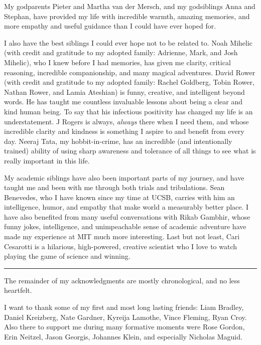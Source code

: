 My godparents Pieter and Martha van der Mersch, and my godsiblings Anna and Stephan, have provided my life with incredible warmth, amazing memories, and more empathy and useful guidance than I could have ever hoped for.



I also have the best siblings I could ever hope not to be related to.
%
Noah Mihelic (with credit and gratitude to my adopted family: Adrienne, Mark, and Josh Mihelic), who I knew before I had memories, has given me clarity, critical reasoning, incredible companionship, and many magical adventures.
%
David Rower (with credit and gratitude to my adopted family: Rachel Goldberg, Tobin Rower, Nathan Rower, and Lamia Ateshian) is funny, creative, and intelligent beyond words.
%
He has taught me countless invaluable lessons about being a clear and kind human being.
%
To say that his infectious positivity has changed my life is an understatement.
%
J Rogers is always, \textit{always} there when I need them, and whose incredible clarity and kindness is something I aspire to and benefit from every day.
%
Neeraj Tata, my hobbit-in-crime, has an incredible (and intentionally trained) ability of using sharp awareness and tolerance of all things to see what is really important in this life.


My academic siblings have also been important parts of my journey, and have taught me and been with me through both trials and tribulations.
%
Sean Benevedes, who I have known since my time at UCSB, carries with him an intelligence, humor, and empathy that make world a measurably better place.
%
I have also benefited from many useful conversations with Rikab Gambhir, whose funny jokes, intelligence, and unimpeachable sense of academic adventure have made my experience at MIT much more interesting.
%
Last but not least, Cari Cesarotti is a hilarious, high-powered, creative scientist who I love to watch playing the game of science and winning.



\vspace{10pt}
\hrule
\vspace{10pt}



The remainder of my acknowledgments are mostly chronological, and no less heartfelt.


I want to thank some of my first and most long lasting friends:
%
Liam Bradley, Daniel Kreizberg, Nate Gardner, Kyreija Lamothe, Vince Fleming, Ryan Croy.
%
Also there to support me during many formative moments were Rose Gordon, Erin Neitzel, Jason Georgis, Johannes Klein, and especially Nicholas Maguid.



